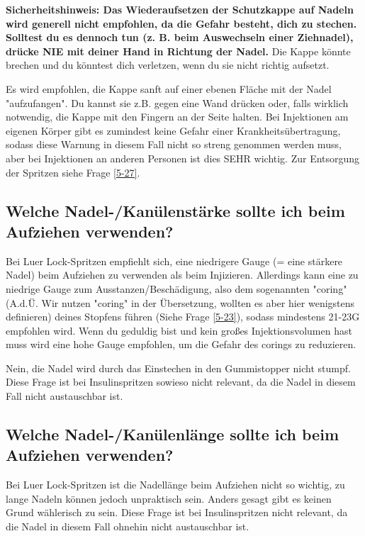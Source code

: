 \documentclass{article}
\begin{document}
\textbf{Sicherheitshinweis: Das Wiederaufsetzen der Schutzkappe auf Nadeln wird generell nicht empfohlen, da die Gefahr besteht, dich zu stechen. Solltest du es dennoch tun (z. B. beim Auswechseln einer Ziehnadel), drücke NIE mit deiner Hand in Richtung der Nadel.} Die Kappe könnte brechen und du könntest dich verletzen, wenn du sie nicht richtig aufsetzt. 

Es wird empfohlen, die Kappe sanft auf einer ebenen Fläche mit der Nadel "aufzufangen". Du kannst sie z.B. gegen eine Wand drücken oder, falls wirklich notwendig, die Kappe mit den Fingern an der Seite halten. Bei Injektionen am eigenen Körper gibt es zumindest keine Gefahr einer Krankheitsübertragung, sodass diese Warnung in diesem Fall nicht so streng genommen werden muss, aber bei Injektionen an anderen Personen ist dies SEHR wichtig. Zur Entsorgung der Spritzen siehe Frage \ref{5-27}.

\subsection{Welche Nadel-/Kanülenstärke sollte ich beim Aufziehen verwenden?}

Bei Luer Lock-Spritzen empfiehlt sich, eine niedrigere Gauge (= eine stärkere Nadel) beim Aufziehen zu verwenden als beim Injizieren. Allerdings kann eine zu niedrige Gauge zum Ausstanzen/Beschädigung, also dem sogenannten "coring" (A.d.Ü. Wir nutzen "coring" in der Übersetzung, wollten es aber hier wenigstens definieren) deines Stopfens führen (Siehe Frage \ref{5-23}), sodass mindestens 21-23G empfohlen wird. Wenn du geduldig bist und kein großes Injektionsvolumen hast muss wird eine hohe Gauge empfohlen, um die Gefahr des corings zu reduzieren. 

Nein, die Nadel wird durch das Einstechen in den Gummistopper nicht stumpf. Diese Frage ist bei Insulinspritzen sowieso nicht relevant, da die Nadel in diesem Fall nicht austauschbar ist.

\subsection{Welche Nadel-/Kanülenlänge sollte ich beim Aufziehen verwenden?}

Bei Luer Lock-Spritzen ist die Nadellänge beim Aufziehen nicht so wichtig, zu lange Nadeln können jedoch unpraktisch sein. Anders gesagt gibt es keinen Grund wählerisch zu sein. Diese Frage ist bei Insulinspritzen nicht relevant, da die Nadel in diesem Fall ohnehin nicht austauschbar ist.
\end{document}
